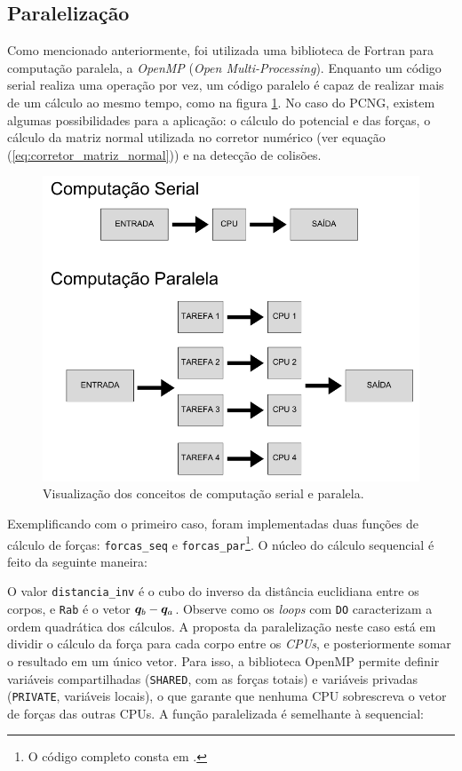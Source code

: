 \subsection{Paralelização}\label{subsecao:paralelizacao}
Como mencionado anteriormente, foi utilizada uma biblioteca de Fortran para computação paralela, a \textit{OpenMP} (\textit{Open Multi-Processing}). Enquanto um código serial realiza uma operação por vez, um código paralelo é capaz de realizar mais de um cálculo ao mesmo tempo, como na figura \ref{fig:computacao_serial_paralela}. No caso do PCNG, existem algumas possibilidades para a aplicação: o cálculo do potencial e das forças, o cálculo da matriz normal utilizada no corretor numérico (ver equação (\ref{eq:corretor_matriz_normal})) e na detecção de colisões.

\begin{figure}[H]
    \centering
    \includegraphics[width=0.5\linewidth]{tcc//img/computacao_serial_paralela.png}
        \caption{Visualização dos conceitos de computação serial e paralela.}
    \label{fig:computacao_serial_paralela}
\end{figure}

Exemplificando com o primeiro caso, foram implementadas duas funções de cálculo de forças: \verb|forcas_seq| e \verb|forcas_par|\footnote{O código completo consta em \cite{potalej_gravidade-fortran}.}. O núcleo do cálculo sequencial é feito da seguinte maneira:



O valor \verb|distancia_inv| é o cubo do inverso da distância euclidiana entre os corpos, e \verb|Rab| é o vetor $\bm q_b - \bm q_a$. Observe como os \textit{loops} com \verb|DO| caracterizam a ordem quadrática dos cálculos. A proposta da paralelização neste caso está em dividir o cálculo da força para cada corpo entre os \textit{CPUs}, e posteriormente somar o resultado em um único vetor. Para isso, a biblioteca OpenMP permite definir variáveis compartilhadas (\verb|SHARED|, com as forças totais) e variáveis privadas (\verb|PRIVATE|, variáveis locais), o que garante que nenhuma CPU sobrescreva o vetor de forças das outras CPUs. A função paralelizada é semelhante à sequencial:

